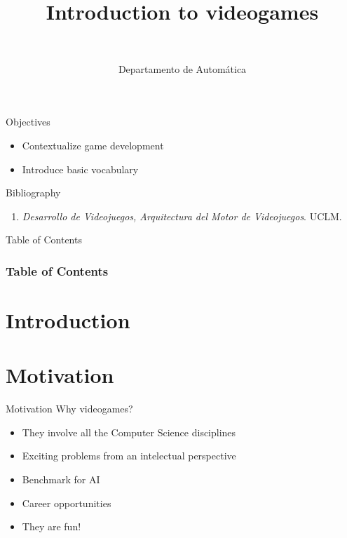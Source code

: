 \documentclass[10pt,compress]{beamer} %
\title[Introduction to videogames]{Introduction to videogames}
\author{\asignatura\\\carrera}
\institute{}
\date{Departamento de Automática}
\begin{document}
{\titlepageBlue
    \begin{frame}
        \titlepage
    \end{frame}
}

\begin{frame}[plain]{}
   \begin{block}{Objectives}
   \begin{itemize}
   		\item Contextualize game development
		\item Introduce basic vocabulary
	\end{itemize}
	\end{block}

   \begin{block}{Bibliography}
      \begin{enumerate}
          \item  \textit{Desarrollo de Videojuegos, Arquitectura del Motor de Videojuegos}. UCLM.
      \end{enumerate} 
   \end{block}
\end{frame}


{
\begin{frame}[shrink]{Table of Contents}
 \frametitle{Table of Contents}
 \tableofcontents
\end{frame}
}

\section{Introduction}

\section[Motivation]{Motivation}
\begin{frame}{Motivation}
	Why videogames?
	\begin{itemize}
		\item They involve all the Computer Science disciplines
		\item Exciting problems from an intelectual perspective
		\item Benchmark for AI
		\item Career opportunities
		\item They are fun!
  	\end{itemize}
\end{frame}
\end{document}
